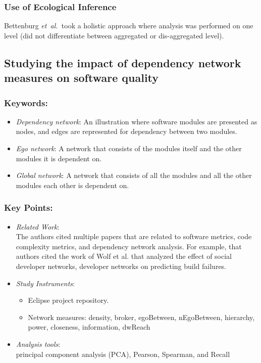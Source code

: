 \documentclass{sig-alternate-05-2015}
\newcommand{\etal}{\mbox{\emph{et al.\ }}}
\begin{document}
\subsubsection{Use of Ecological Inference}
Bettenburg \etal took a holistic approach where analysis was performed on one level (did not differentiate between aggregated or dis-aggregated level).

\subsection{Studying the impact of dependency network measures on software quality \cite{Nguyen:2010}}

\subsubsection{Keywords:}
\begin{itemize}
\item \emph{Dependency network}:  An illustration where software modules are presented as nodes, and edges are represented for dependency between two modules.
\item \emph{Ego network}:  A network that consists of the modules itself and the other modules it is dependent on.
\item \emph{Global network}: A network that consists of all the modules and all the other modules each other is dependent on.
\end{itemize} 

\subsubsection{Key Points:}
\begin{itemize}
\item \emph{Related Work}: \\
The authors cited multiple papers that are related to software metrics, code complexity metrics, and dependency network analysis. For example, that authors cited the work of Wolf et al. \cite{Wolf:2009} that analyzed the effect of social developer networks, developer networks on predicting build failures.
\item \emph{Study Instruments}:
	\begin{itemize}
	\item Eclipse project repository.
	\item Network measures: density, broker, egoBetween, nEgoBetween, hierarchy, power, closeness, information, dwReach
	\end{itemize}

\item \emph{Analysis tools}: \\
principal component analysis (PCA), Pearson, Spearman, and Recall
\end{itemize}
\end{document}
